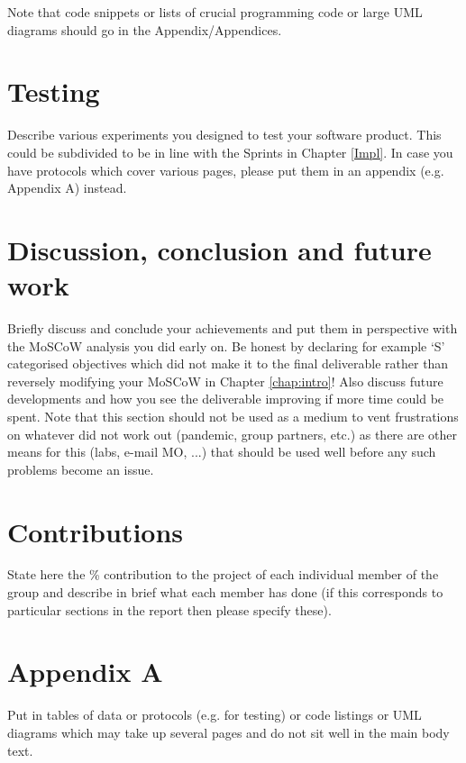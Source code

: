 \documentclass[a4paper, oneside, 11pt]{report}
\begin{document}
Note that code snippets or lists of crucial programming code or large UML diagrams should go in the Appendix/Appendices.


\chapter{Testing}

Describe various experiments you designed to test your software product. This could be subdivided to be in line with the Sprints in Chapter \ref{Impl}. In case you have protocols which cover various pages, please put them in an appendix (e.g. Appendix A) instead.

\chapter{Discussion, conclusion and future work}

Briefly discuss and conclude your achievements and put them in perspective with the MoSCoW analysis you did early on. Be honest by declaring for example `S' categorised objectives which did not make it to the final deliverable rather than reversely modifying your MoSCoW in Chapter \ref{chap:intro}! Also discuss future developments and how you see the deliverable improving if more time could be spent. Note that this section should not be used as a medium to vent frustrations on whatever did not work out (pandemic, group partners, etc.) as there are other means for this (labs, e-mail MO, ...) that should be used well before any such problems become an issue.





\chapter*{Contributions}

State here the \% contribution to the project of each individual member of the group and describe in brief what each member has done (if this corresponds to particular sections in the report then please specify these).

\chapter*{Appendix A}

Put in tables of data or protocols (e.g. for testing) or code listings or UML diagrams which may take up several pages and do not sit well in the main body text.
\end{document}
